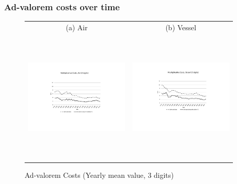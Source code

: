 \documentclass[10 pt,Helvetica, french]{beamer}
\begin{document}
\begin{frame}[label=app_comments_fig1]
\frametitle{Ad-valorem costs over time \hyperlink{slide_comments_fig1}{}}
\begin{figure}[htbp]
\caption{Ad-valorem Costs (Yearly mean value, 3 digits)}
\label{fig:mult_alone_withadd}
\begin{center}
\begin{tabular}{cc}
{\small (a) Air } & {\small (b) Vessel}\\
\includegraphics[width=5cm, height=2.5in]{Fig1a_mult_air_3d.pdf}
& \includegraphics[width=5cm,height=2.5in]{Fig1b_mult_vessel_3d.pdf} \\
\end{tabular}
\end{center}
\end{figure}

\end{frame}
\end{document}
